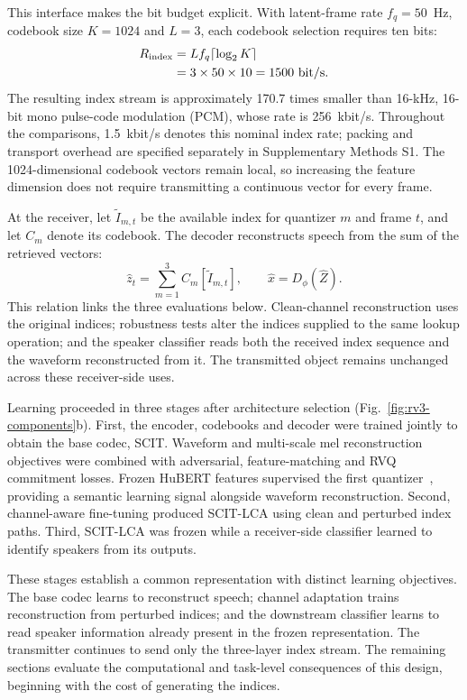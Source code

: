 This interface makes the bit budget explicit. With latent-frame rate $f_q=50$~Hz, codebook size $K=1024$ and $L=3$, each codebook selection requires ten bits:
\begin{equation}
\begin{aligned}
R_{\rm index}
&=Lf_q\lceil\log_2K\rceil\\
&=3\times50\times10=1500\ {\rm bit/s}.
\end{aligned}
\label{eq:rv3-rate}
\end{equation}
The resulting index stream is approximately 170.7 times smaller than 16-kHz, 16-bit mono pulse-code modulation (PCM), whose rate is 256~kbit/s. Throughout the comparisons, 1.5~kbit/s denotes this nominal index rate; packing and transport overhead are specified separately in Supplementary Methods S1. The 1024-dimensional codebook vectors remain local, so increasing the feature dimension does not require transmitting a continuous vector for every frame.

At the receiver, let $\widetilde I_{m,t}$ be the available index for quantizer $m$ and frame $t$, and let $C_m$ denote its codebook. The decoder reconstructs speech from the sum of the retrieved vectors:
\begin{equation}
\hat z_t=\sum_{m=1}^{3}C_m[\widetilde I_{m,t}],
\qquad \hat x=D_\phi(\hat Z).
\label{eq:rv3-reconstruction}
\end{equation}
This relation links the three evaluations below. Clean-channel reconstruction uses the original indices; robustness tests alter the indices supplied to the same lookup operation; and the speaker classifier reads both the received index sequence and the waveform reconstructed from it. The transmitted object remains unchanged across these receiver-side uses.

Learning proceeded in three stages after architecture selection (Fig.~\ref{fig:rv3-components}b). First, the encoder, codebooks and decoder were trained jointly to obtain the base codec, SCIT. Waveform and multi-scale mel reconstruction objectives were combined with adversarial, feature-matching and RVQ commitment losses. Frozen HuBERT features supervised the first quantizer~\cite{hubert}, providing a semantic learning signal alongside waveform reconstruction. Second, channel-aware fine-tuning produced SCIT-LCA using clean and perturbed index paths. Third, SCIT-LCA was frozen while a receiver-side classifier learned to identify speakers from its outputs.

These stages establish a common representation with distinct learning objectives. The base codec learns to reconstruct speech; channel adaptation trains reconstruction from perturbed indices; and the downstream classifier learns to read speaker information already present in the frozen representation. The transmitter continues to send only the three-layer index stream. The remaining sections evaluate the computational and task-level consequences of this design, beginning with the cost of generating the indices.

